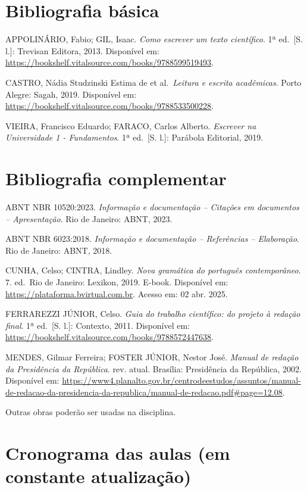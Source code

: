 \documentclass[
]{book}
\begin{document}
\newpage

\section{Bibliografia básica}\label{bibliografia-buxe1sica}

APPOLINÁRIO, Fabio; GIL, Isaac. \emph{Como escrever um texto científico}. 1ª ed.~{[}S. l.{]}: Trevisan Editora, 2013. Disponível em: \url{https://bookshelf.vitalsource.com/books/9788599519493}.

CASTRO, Nádia Studzinski Estima de et al.~\emph{Leitura e escrita acadêmicas}. Porto Alegre: Sagah, 2019. Disponível em: \url{https://bookshelf.vitalsource.com/books/9788533500228}.

VIEIRA, Francisco Eduardo; FARACO, Carlos Alberto. \emph{Escrever na Universidade 1 - Fundamentos}. 1ª ed.~{[}S. l.{]}: Parábola Editorial, 2019.

\section{Bibliografia complementar}\label{bibliografia-complementar}

ABNT NBR 10520:2023. \emph{Informação e documentação -- Citações em documentos -- Apresentação}. Rio de Janeiro: ABNT, 2023.

ABNT NBR 6023:2018. \emph{Informação e documentação -- Referências -- Elaboração}. Rio de Janeiro: ABNT, 2018.

CUNHA, Celso; CINTRA, Lindley. \emph{Nova gramática do português contemporâneo}. 7. ed.~Rio de Janeiro: Lexikon, 2019. E-book. Disponível em: \url{https://plataforma.bvirtual.com.br}. Acesso em: 02 abr. 2025.

FERRAREZZI JÚNIOR, Celso. \emph{Guia do trabalho científico: do projeto à redação final}. 1ª ed.~{[}S. l.{]}: Contexto, 2011. Disponível em: \url{https://bookshelf.vitalsource.com/books/9788572447638}.

MENDES, Gilmar Ferreira; FOSTER JÚNIOR, Nestor José. \emph{Manual de redação da Presidência da República}. rev. atual. Brasília: Presidência da República, 2002. Disponível em: \url{https://www4.planalto.gov.br/centrodeestudos/assuntos/manual-de-redacao-da-presidencia-da-republica/manual-de-redacao.pdf\#page=12.08}.

Outras obras poderão ser usadas na disciplina.

\section{Cronograma das aulas (em constante atualização)}\label{cronograma-das-aulas-em-constante-atualizauxe7uxe3o}
\end{document}
